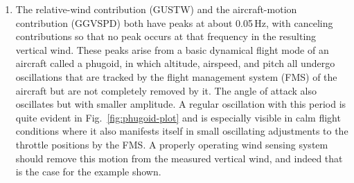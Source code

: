 \documentclass[12pt,twoside,english]{article}\usepackage[]{graphicx}\usepackage[]{color}
\newenvironment{knitrout}{}{} %
\let\OrgIndex\index
\renewcommand*{\index}[1]{\OrgIndex{#1}}
\begin{document}
\begin{enumerate}
\item The relative-wind contribution (GUSTW) and the aircraft-motion contribution (GGVSPD) both have peaks at about 0.05\,Hz, with canceling contributions so that no peak occurs at that frequency in the resulting vertical wind. These peaks arise from a basic dynamical flight mode of an aircraft called a phugoid, in which altitude, airspeed, and pitch all undergo oscillations that are tracked by the flight management system (FMS) of the aircraft  but are not completely removed by it. The angle of attack also oscillates but with smaller amplitude. A regular oscillation with this period is quite evident in Fig.~\ref{fig:phugoid-plot} and is especially visible in calm flight conditions where it also manifests itself in small oscillating adjustments to the throttle positions by the FMS. A properly operating wind sensing system should remove this motion from the measured vertical wind, and indeed that is the case for the example shown.

\begin{knitrout}\footnotesize
{}\color{fgcolor}\begin{figure}


\end{figure}
\end{knitrout}
\end{enumerate}
\end{document}
